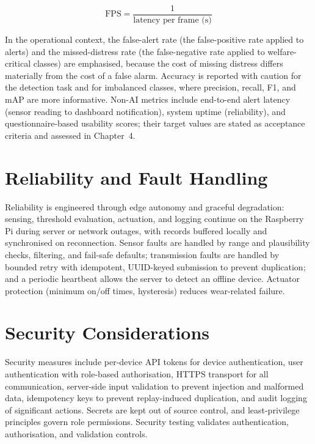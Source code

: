 \documentclass[12pt,a4paper]{report}
\begin{document}
\begin{equation}
\text{FPS} = \frac{1}{\text{latency per frame (s)}}
\end{equation}

In the operational context, the false-alert rate (the false-positive rate applied to alerts) and the missed-distress rate (the false-negative rate applied to welfare-critical classes) are emphasised, because the cost of missing distress differs materially from the cost of a false alarm. Accuracy is reported with caution for the detection task and for imbalanced classes, where precision, recall, F1, and mAP are more informative. Non-AI metrics include end-to-end alert latency (sensor reading to dashboard notification), system uptime (reliability), and questionnaire-based usability scores; their target values are stated as acceptance criteria and assessed in Chapter~4.

\section{Reliability and Fault Handling}

Reliability is engineered through edge autonomy and graceful degradation: sensing, threshold evaluation, actuation, and logging continue on the Raspberry Pi during server or network outages, with records buffered locally and synchronised on reconnection. Sensor faults are handled by range and plausibility checks, filtering, and fail-safe defaults; transmission faults are handled by bounded retry with idempotent, UUID-keyed submission to prevent duplication; and a periodic heartbeat allows the server to detect an offline device. Actuator protection (minimum on/off times, hysteresis) reduces wear-related failure.

\section{Security Considerations}

Security measures include per-device API tokens for device authentication, user authentication with role-based authorisation, HTTPS transport for all communication, server-side input validation to prevent injection and malformed data, idempotency keys to prevent replay-induced duplication, and audit logging of significant actions. Secrets are kept out of source control, and least-privilege principles govern role permissions. Security testing validates authentication, authorisation, and validation controls.
\end{document}
